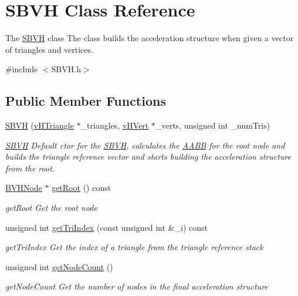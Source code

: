 \hypertarget{classSBVH}{\section{S\-B\-V\-H Class Reference}
\label{classSBVH}
}


The \hyperlink{classSBVH}{S\-B\-V\-H} class The class builds the acceleration structure when given a vector of triangles and vertices.  




{\ttfamily \#include $<$S\-B\-V\-H.\-h$>$}

\subsection*{Public Member Functions}
\begin{DoxyCompactItemize}
\item 
\hyperlink{classSBVH_ae0fdf31d3d402ea09c63d261977f4192}{S\-B\-V\-H} (\hyperlink{structvHTriangle}{v\-H\-Triangle} $\ast$\-\_\-triangles, \hyperlink{structvHVert}{v\-H\-Vert} $\ast$\-\_\-verts, unsigned int \-\_\-num\-Tris)
\begin{DoxyCompactList}\small\item\em \hyperlink{classSBVH}{S\-B\-V\-H} Default ctor for the \hyperlink{classSBVH}{S\-B\-V\-H}, calculates the \hyperlink{classAABB}{A\-A\-B\-B} for the root node and builds the triangle reference vector and starts building the acceleration structure from the root. \end{DoxyCompactList}\item 
\hyperlink{classBVHNode}{B\-V\-H\-Node} $\ast$ \hyperlink{classSBVH_a7d65b77c45768401d3f7740698f01164}{get\-Root} () const 
\begin{DoxyCompactList}\small\item\em get\-Root Get the root node \end{DoxyCompactList}\item 
unsigned int \hyperlink{classSBVH_af7a06b4c346366f15b15730f10346c10}{get\-Tri\-Index} (const unsigned int \&\-\_\-i) const 
\begin{DoxyCompactList}\small\item\em get\-Tri\-Index Get the index of a triangle from the triangle reference stack \end{DoxyCompactList}\item 
unsigned int \hyperlink{classSBVH_ac30b20f84eebea2a929e2f201936e62f}{get\-Node\-Count} ()
\begin{DoxyCompactList}\small\item\em get\-Node\-Count Get the number of nodes in the final acceleration structure \end{DoxyCompactList}\end{DoxyCompactItemize}



